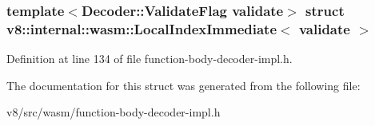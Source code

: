 \subsubsection*{template$<$Decoder\+::\+Validate\+Flag validate$>$\newline
struct v8\+::internal\+::wasm\+::\+Local\+Index\+Immediate$<$ validate $>$}



Definition at line 134 of file function-\/body-\/decoder-\/impl.\+h.



The documentation for this struct was generated from the following file\+:\begin{DoxyCompactItemize}
\item 
v8/src/wasm/function-\/body-\/decoder-\/impl.\+h\end{DoxyCompactItemize}
